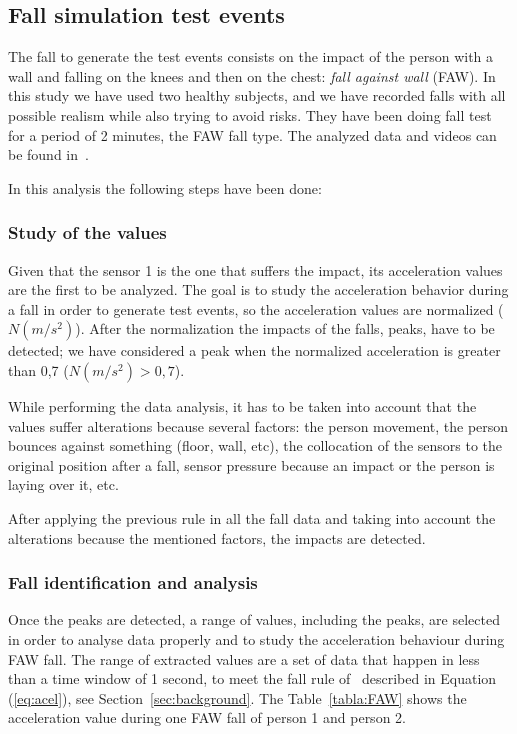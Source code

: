 \documentclass[review]{elsarticle}
\begin{document}
\subsection{Fall simulation test events}

The fall to generate the test events consists on the impact of the person with 
a wall and falling on the knees and then on the chest: \textit{fall against wall} (FAW). 
In this study we have used two healthy subjects, and we have recorded falls with all 
possible realism while also trying to avoid risks. They have been doing fall test for a period 
of 2 minutes, the FAW fall type. The analyzed data and videos can be found in~\cite{FallRepo}.

In this analysis the following steps have been done:

\subsubsection*{Study of the values} Given that the sensor 1 is the one that suffers the 
impact, its acceleration values are the first to be analyzed. The goal is to study 
the acceleration behavior during a fall in order to generate test events, so the acceleration 
values are normalized ($N(m/s^2)$). After the normalization the impacts of the falls, peaks, 
have to be detected; we have considered a peak when the normalized acceleration is 
greater than 0,7 ($N(m/s^2) > 0,7$). 

While performing the data analysis, it has to be taken into account that the values suffer 
alterations because several factors: the person movement, the person bounces against something 
(floor, wall, etc), the collocation of the sensors to the original position after a fall, 
sensor pressure because an impact or the person is laying over it, etc.

After applying the previous rule in all the fall data and taking into account the alterations 
because the mentioned factors, the impacts are detected.

\subsubsection*{Fall identification and analysis} Once the peaks are detected, a range of values, 
including the peaks, are selected in order to analyse data properly and to study the acceleration 
behaviour during FAW fall. The range of extracted values are a set of data that happen in less 
than a time window of 1 second, to meet the fall rule of~\cite{Luder2009} described in Equation (\ref{eq:acel}), see Section~\ref{sec:background}. The Table~\ref{tabla:FAW} shows the 
acceleration value during one FAW fall of person 1 and person 2. 
\end{document}

